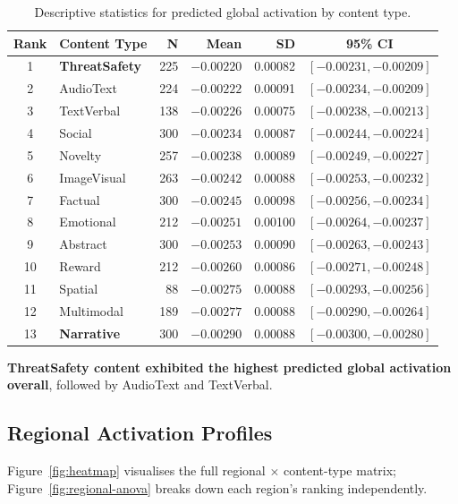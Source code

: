 \documentclass[11pt,letterpaper]{article}
\numberwithin{equation}{section}
\begin{document}
\begin{table}[ht]
\centering
\small
\caption{Descriptive statistics for predicted global activation by content type.}
\label{tab:descriptive}
\begin{tabular}{c l r r r c}
\toprule
\textbf{Rank} & \textbf{Content Type} & \textbf{N} & \textbf{Mean} & \textbf{SD} & \textbf{95\% CI} \\
\midrule
 1 & \textbf{ThreatSafety} & 225 & $-0.00220$ & 0.00082 & $[-0.00231, -0.00209]$ \\
 2 & AudioText             & 224 & $-0.00222$ & 0.00091 & $[-0.00234, -0.00209]$ \\
 3 & TextVerbal            & 138 & $-0.00226$ & 0.00075 & $[-0.00238, -0.00213]$ \\
 4 & Social                & 300 & $-0.00234$ & 0.00087 & $[-0.00244, -0.00224]$ \\
 5 & Novelty               & 257 & $-0.00238$ & 0.00089 & $[-0.00249, -0.00227]$ \\
 6 & ImageVisual           & 263 & $-0.00242$ & 0.00088 & $[-0.00253, -0.00232]$ \\
 7 & Factual               & 300 & $-0.00245$ & 0.00098 & $[-0.00256, -0.00234]$ \\
 8 & Emotional             & 212 & $-0.00251$ & 0.00100 & $[-0.00264, -0.00237]$ \\
 9 & Abstract              & 300 & $-0.00253$ & 0.00090 & $[-0.00263, -0.00243]$ \\
10 & Reward                & 212 & $-0.00260$ & 0.00086 & $[-0.00271, -0.00248]$ \\
11 & Spatial               &  88 & $-0.00275$ & 0.00088 & $[-0.00293, -0.00256]$ \\
12 & Multimodal            & 189 & $-0.00277$ & 0.00088 & $[-0.00290, -0.00264]$ \\
13 & \textbf{Narrative}    & 300 & $-0.00290$ & 0.00088 & $[-0.00300, -0.00280]$ \\
\bottomrule
\end{tabular}
\end{table}

\textbf{ThreatSafety content exhibited the highest predicted global activation overall}, followed by AudioText and TextVerbal.

\subsection{Regional Activation Profiles}

Figure~\ref{fig:heatmap} visualises the full regional $\times$ content-type matrix; Figure~\ref{fig:regional-anova} breaks down each region's ranking independently.
\end{document}
